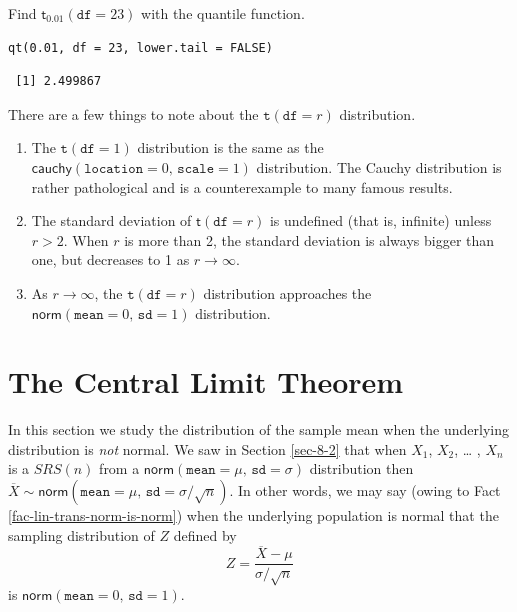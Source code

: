 \documentclass[captions=tableheading]{scrbook}
\begin{document}
\begin{example}
Find \(\mathsf{t}{}_{0.01}(\mathtt{df}=23)\) with the quantile function.
\end{example}


\lstset{language=R}
\begin{lstlisting}
qt(0.01, df = 23, lower.tail = FALSE)
\end{lstlisting}

\begin{verbatim}
 [1] 2.499867
\end{verbatim}

\begin{rem}
There are a few things to note about the \(\mathtt{t}(\mathtt{df}=r)\) distribution.
\begin{enumerate}
\item The \(\mathtt{t}(\mathtt{df}=1)\) distribution is the same as the \(\mathsf{cauchy}(\mathtt{location}=0,\,\mathtt{scale}=1)\) distribution. The Cauchy distribution is rather pathological and is a counterexample to many famous results.
\item The standard deviation of \(\mathsf{t}(\mathtt{df}=r)\) is undefined (that is, infinite) unless \(r>2\). When \(r\) is more than 2, the standard deviation is always bigger than one, but decreases to 1 as \(r\to\infty\).
\item As \(r\to\infty\), the \(\mathtt{t}(\mathtt{df}=r)\) distribution approaches the \(\mathsf{norm}(\mathtt{mean}=0,\,\mathtt{sd}=1)\) distribution.
\end{enumerate}

\end{rem}
\section{The Central Limit Theorem}
\label{sec-8-3}
\label{sec-Central-Limit-Theorem}


In this section we study the distribution of the sample mean when the underlying distribution is \emph{not} normal. We saw in Section \ref{sec-8-2} that when \(X_{1}\), \(X_{2}\), \ldots{} , \(X_{n}\) is a \(SRS(n)\) from a \(\mathsf{norm}(\mathtt{mean}=\mu,\,\mathtt{sd}=\sigma)\) distribution then \(\overline{X}\sim\mathsf{norm}(\mathtt{mean}=\mu,\,\mathtt{sd}=\sigma/\sqrt{n})\). In other words, we may say (owing to Fact \ref{fac-lin-trans-norm-is-norm}) when the underlying population is normal that the sampling distribution of \(Z\) defined by
\begin{equation}
Z=\frac{\overline{X}-\mu}{\sigma/\sqrt{n}}
\end{equation}
is \(\mathsf{norm}(\mathtt{mean}=0,\,\mathtt{sd}=1)\). 
\end{document}

